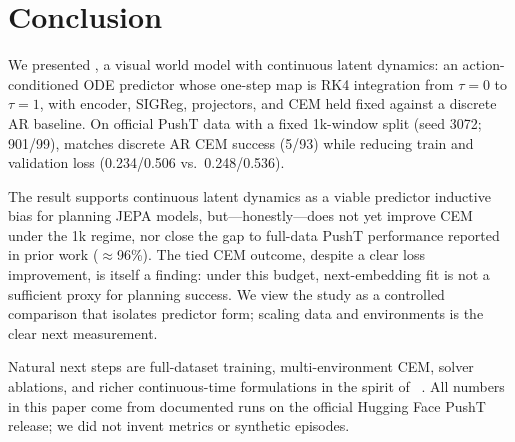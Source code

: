 \section{Conclusion}
\label{sec:conclusion}

We presented \method{}, a visual world model with continuous latent
dynamics: an action-conditioned ODE predictor whose one-step map is RK4
integration from $\tau{=}0$ to $\tau{=}1$, with encoder, SIGReg,
projectors, and CEM held fixed against a discrete AR baseline.
On official PushT data with a fixed 1k-window split (seed 3072;
901/99), \method{} matches discrete AR CEM success (5/93) while
reducing train and validation loss (0.234/0.506 vs.\ 0.248/0.536).

The result supports continuous latent dynamics as a viable predictor
inductive bias for planning JEPA models, but---honestly---does not
yet improve CEM under the 1k regime, nor close the gap to
full-data PushT performance reported in prior work ($\approx$96\%).
The tied CEM outcome, despite a clear loss improvement, is itself a
finding: under this budget, next-embedding fit is not a sufficient
proxy for planning success.
We view the study as a controlled comparison that isolates predictor
form; scaling data and environments is the clear next measurement.

Natural next steps are full-dataset training, multi-environment CEM,
solver ablations, and richer continuous-time formulations in the
spirit of \PriorODEWorld{}~\cite{liu2026odeworld}.
All numbers in this paper come from documented runs on the official
Hugging Face PushT release; we did not invent metrics or synthetic
episodes.
